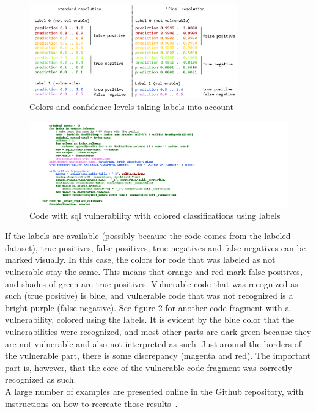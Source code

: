 \documentclass[
a4paper,
pagesize,
pdftex,
12pt,
ngerman,
fleqn,
final,
]{scrartcl}
\begin{document}
	\begin{figure}[h]
		\centering
		\includegraphics[width=0.8\textwidth]{img/colorkeylabeled}
		\caption{Colors and confidence levels taking labels into account}
		\label{fig:examplecolored}
	\end{figure}	
	\begin{figure}[h]
		\centering
		\includegraphics[width=1\textwidth]{img/exampleSQL.png}
		\caption{Code with sql vulnerability with colored classifications using labels}
		\label{fig:example2}
	\end{figure}

	If the labels are available (possibly because the code comes from the labeled dataset), true positives, false positives, true negatives and false negatives can be marked visually. In this case, the colors for code that was labeled as not vulnerable stay the same. This means that orange and red mark false positives, and shades of green are true positives. Vulnerable code that was recognized as such (true positive) is blue, and vulnerable code that was not recognized is a bright purple (false negative). See figure \ref{fig:example2} for another code fragment with a vulnerability, colored using the labels. It is evident by the blue color that the vulnerabilities were recognized, and most other parts are dark green because they are not vulnerable and also not interpreted as such. Just around the borders of the vulnerable part, there is some discrepancy (magenta and red). The important part is, however, that the core of the vulnerable code fragment was correctly recognized as such.\\
	A large number of examples are presented online in the Github repository, with instructions on how to recreate those results~\cite{Wartschinski.2.12.2019}.
	
\end{document}
